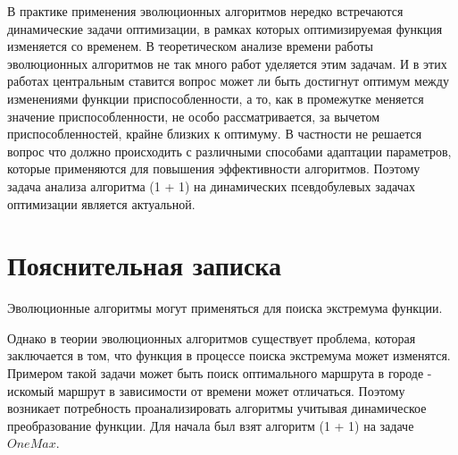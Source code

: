 \documentclass[times]{itmo-student-thesis}
\begin{document}




    \tableofcontents


    \startprefacepage

    В практике применения эволюционных алгоритмов нередко встречаются динамические задачи оптимизации, в рамках которых оптимизируемая функция изменяется со временем.
    В теоретическом анализе времени работы эволюционных алгоритмов не так много работ уделяется этим задачам.
    И в этих работах центральным ставится вопрос может ли быть достигнут оптимум между изменениями функции приспособленности, а то, как в промежутке меняется значение приспособленности, не особо рассматривается, за вычетом приспособленностей, крайне близких к оптимуму.
    В частности не решается вопрос что должно происходить с различными способами адаптации параметров, которые применяются для повышения эффективности алгоритмов. Поэтому задача анализа алгоритма (1 + 1) на динамических псевдобулевых задачах оптимизации является актуальной.


    \chapter{Пояснительная записка}

    Эволюционные алгоритмы могут применяться для поиска экстремума функции.

    Однако в теории эволюционных алгоритмов существует проблема, которая заключается в том, что функция в процессе поиска экстремума может изменятся.
    Примером такой задачи может быть поиск оптимального маршрута в городе - искомый маршрут в зависимости от времени может отличаться.
    Поэтому возникает потребность проанализировать алгоритмы учитывая динамическое преобразование функции.
    Для начала был взят алгоритм (1 + 1) на задаче $OneMax$.
\end{document}
